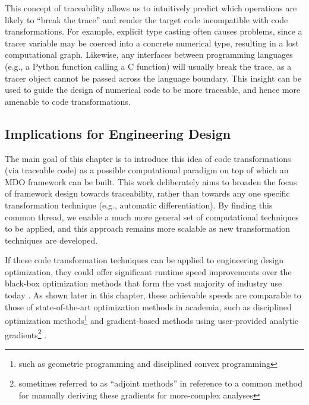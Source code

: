 This concept of traceability allows us to intuitively predict which operations are likely to ``break the trace'' and render the target code incompatible with code transformations. For example, explicit type casting often causes problems, since a tracer variable may be coerced into a concrete numerical type, resulting in a lost computational graph. Likewise, any interfaces between programming languages (e.g., a Python function calling a C function) will usually break the trace, as a tracer object cannot be passed across the language boundary. This insight can be used to guide the design of numerical code to be more traceable, and hence more amenable to code transformations.


\subsection{Implications for Engineering Design}

The main goal of this chapter is to introduce this idea of code transformations (via traceable code) as a possible computational paradigm on top of which an MDO framework can be built. This work deliberately aims to broaden the focus of framework design towards traceability, rather than towards any one specific transformation technique (e.g., automatic differentiation). By finding this common thread, we enable a much more general set of computational techniques to be applied, and this approach remains more scalable as new transformation techniques are developed.

If these code transformation techniques can be applied to engineering design optimization, they could offer significant runtime speed improvements over the black-box optimization methods that form the vast majority of industry use today \cite{martins_engineering_2021, lavin_simulation_2022}. As shown later in this chapter, these achievable speeds are comparable to those of state-of-the-art optimization methods in academia, such as disciplined optimization methods\footnote{such as geometric programming and disciplined convex programming} \cite{grant_disciplined_2006, gpkit, boyd_convex_2004, agrawal_disciplined_2019} and gradient-based methods using user-provided analytic gradients\footnote{sometimes referred to as ``adjoint methods'' in reference to a common method for manually deriving these gradients for more-complex analyses} \cite{gray_openmdao_2019, kenway_effective_2019, innes_don_2019}.

